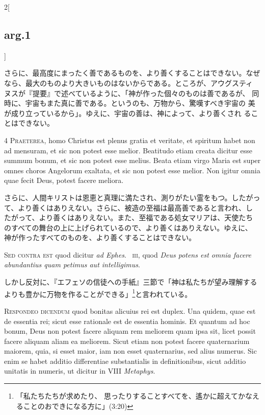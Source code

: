 \documentclass[paper=a4paper,fontsize=10pt,jafontsize=9pt,titlepage]{jlreq}
\begin{document}
\begin{paracol}{2}[\subsection{arg.1}]
\switchcolumn

さらに、最高度にまったく善であるものを、より善くすることはできない。なぜ
 なら、最大のものより大きいものはないからである。ところが、アウグスティ
 ヌスが『提要』で述べているように、「神が作った個々のものは善であるが、
 同時に、宇宙もまた真に善である。というのも、万物から、驚嘆すべき宇宙の
 美が成り立っているから」。ゆえに、宇宙の善は、神によって、より善くされ
 ることはできない。


{\scshape 4 Praeterea}, homo Christus est plenus gratia
et veritate, et spiritum habet non ad mensuram, et sic non potest esse
melior. Beatitudo etiam creata dicitur esse summum bonum, et sic non
potest esse melius. Beata etiam virgo Maria est super omnes choros
Angelorum exaltata, et sic non potest esse melior. Non igitur omnia quae
fecit Deus, potest facere meliora.

\switchcolumn

さらに、人間キリストは恩恵と真理に満たされ、測りがたい霊をもつ。したがっ
 て、より善くはありえない。さらに、被造の至福は最高善であると言われ、し
 たがって、より善くはありえない。また、至福である処女マリアは、天使たち
 のすべての舞台の上に上げられているので、より善くはありえない。ゆえに、
 神が作ったすべてのものを、より善くすることはできない。

\switchcolumn*[\subsection{s.c.}]

{\scshape Sed contra est} quod dicitur {\itshape ad Ephes}.~{\scshape
iii}, quod {\itshape Deus potens est omnia facere abundantius quam
petimus aut intelligimus}.

\switchcolumn

しかし反対に、『エフェソの信徒への手紙』三節で「神は私たちが望み理解する
 よりも豊かに万物を作ることができる」\footnote{「私たちたちが求めたり、
 思ったりすることすべてを、遙かに超えてかなえることのおできになる方に」(3:20)}と言われている。


{\scshape Respondeo dicendum} quod bonitas alicuius rei est duplex. Una
quidem, quae est de essentia rei; sicut esse rationale est de essentia
hominis. Et quantum ad hoc bonum, Deus non potest facere aliquam rem
meliorem quam ipsa sit, licet possit facere aliquam aliam ea
meliorem. Sicut etiam non potest facere quaternarium maiorem, quia, si
esset maior, iam non esset quaternarius, sed alius numerus. Sic enim se
habet additio differentiae substantialis in definitionibus, sicut
additio unitatis in numeris, ut dicitur in VIII {\itshape
Metaphys}.


\end{paracol}
\end{document}

